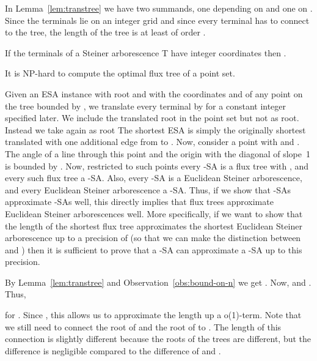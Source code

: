 \documentclass{journalA4}
\begin{document}
\noindent
In Lemma~\ref{lem:transtree} we have two summands, one depending on  and one on . Since the terminals lie on an integer grid and since every terminal has to connect to the tree, the length of the tree is at least of order .
\begin{obs}\label{obs:bound-on-n}
If the terminals of a Steiner arborescence T have integer coordinates then .
\end{obs}

\begin{theorem}\label{thm:nphard-flux}
It is NP-hard to compute the optimal flux tree of a point set.
\end{theorem}
Given an ESA instance with root  and with the coordinates  and  of any point  on the tree bounded by , we translate every terminal by  for a constant integer  specified later. We include the translated root in the point set but not as root. Instead we take  again as root The shortest ESA is simply the originally shortest translated with one additional edge from  to . Now, consider a point  with  and . The angle of a line through this point and the origin with the diagonal of slope~1 is bounded by . Now, restricted to such points every -SA is a flux tree with , and every such flux tree a -SA. Also, every -SA is a Euclidean Steiner arborescence, and every Euclidean Steiner arborescence a -SA. Thus, if we show that -SAs approximate -SAs well, this directly implies that flux trees approximate Euclidean Steiner arborescences well. More specifically, if we want to show that the length of the shortest flux tree approximates the shortest Euclidean Steiner arborescence up to a precision of  (so that we can make the distinction between  and ) then it is sufficient to prove that a -SA  can approximate a -SA  up to this precision.

By Lemma~\ref{lem:transtree} and Observation~\ref{obs:bound-on-n} we get . Now,  and . Thus,

for . Since , this allows us to approximate the length up a o(1)-term. Note that we still need to connect the root of  and the root of  to . The length of this connection is slightly different because the roots of the trees are different, but the difference is negligible compared to the difference of  and . \hfill\QED
\medskip
\end{document}
